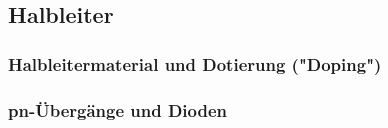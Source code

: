 \subsection{Halbleiter}

\subsubsection{Halbleitermaterial und Dotierung ("Doping")}

\subsubsection{pn-Übergänge und Dioden}
